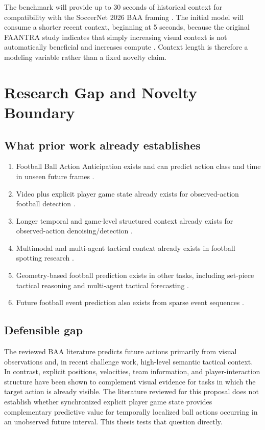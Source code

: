 \documentclass[11pt,a4paper]{article}
\begin{document}
The benchmark will provide up to 30 seconds of historical context for compatibility with the SoccerNet 2026 BAA framing \citep{cioppa2026soccernet}. The initial model will consume a shorter recent context, beginning at 5 seconds, because the original FAANTRA study indicates that simply increasing visual context is not automatically beneficial and increases compute \citep{dalal2025faantra}. Context length is therefore a modeling variable rather than a fixed novelty claim.

\section{Research Gap and Novelty Boundary}
\subsection{What prior work already establishes}
\begin{enumerate}
  \item Football Ball Action Anticipation exists and can predict action class and time in unseen future frames \citep{dalal2025faantra,cioppa2026soccernet}.
  \item Video plus explicit player game state already exists for observed-action football detection \citep{ochin2025gamestate}.
  \item Longer temporal and game-level structured context already exists for observed-action denoising/detection \citep{ochin2025beyond}.
  \item Multimodal and multi-agent tactical context already exists in football spotting research \citep{ochin2025footpass}.
  \item Geometry-based football prediction exists in other tasks, including set-piece tactical reasoning and multi-agent tactical forecasting \citep{wang2024tacticai,rao2026gentac,xu2026tacticgen}.
  \item Future football event prediction also exists from sparse event sequences \citep{simpson2022seq2event,hong2025scoutgpt}.
\end{enumerate}

\subsection{Defensible gap}
The reviewed BAA literature predicts future actions primarily from visual observations and, in recent challenge work, high-level semantic tactical context. In contrast, explicit positions, velocities, team information, and player-interaction structure have been shown to complement visual evidence for tasks in which the target action is already visible. The literature reviewed for this proposal does not establish whether synchronized explicit player game state provides complementary predictive value for temporally localized ball actions occurring in an unobserved future interval. This thesis tests that question directly.
\end{document}
